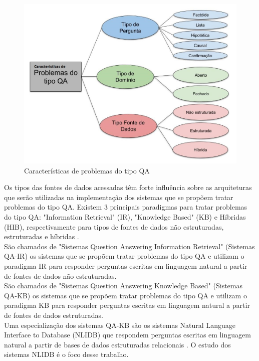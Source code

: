 \documentclass{article}
\begin{document}
\begin{figure}[h!]
\centering
\includegraphics[scale=0.3]{SistemaQA2.jpg}
\caption{Características de problemas do tipo QA}
\label{fig:SistemaQA}
\end{figure}

Os tipos das fontes de dados acessadas têm forte influência sobre as arquiteturas que serão utilizadas na implementação dos sistemas que se propõem tratar problemas do tipo QA. Existem 3 principais paradigmas para tratar problemas do tipo QA: "Information Retrieval" (IR), "Knowledge Based" (KB) e Híbridas (HIB), respectivamente para tipos de fontes de dados não estruturadas, estruturadas e híbridas \citep{speech}.\\

São chamados de "Sistemas Question Answering Information Retrieval" (Sistemas QA-IR) os sistemas que se propõem tratar problemas do tipo QA e utilizam o paradigma IR para responder perguntas escritas em linguagem natural a partir de fontes de dados não estruturadas.\\

São chamados de "Sistemas Question Answering Knowledge Based" (Sistemas QA-KB) os sistemas que se propõem tratar problemas do tipo QA e utilizam o paradigma KB para responder perguntas escritas em linguagem natural a partir de fontes de dados estruturadas.\\

Uma especialização dos sistemas QA-KB são os sistemas Natural Language Interface to Database (NLIDB) que respondem perguntas escritas em linguagem natural a partir de bases de dados estruturadas relacionais \citep{androutsopoulos1995natural}. O estudo dos sistemas NLIDB é o foco desse trabalho.\\
\end{document}
